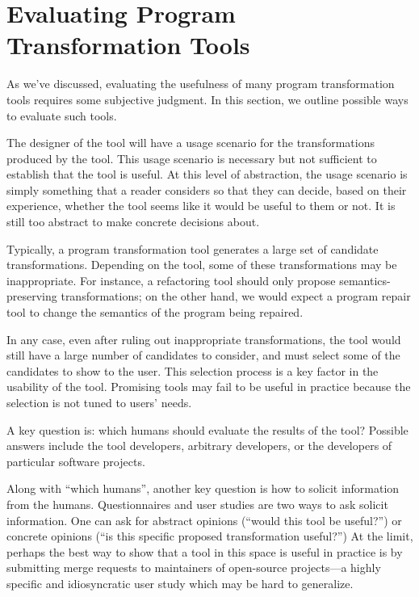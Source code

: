 \section{Evaluating Program Transformation Tools}
\label{sec:how-to-evaluate}
As we've discussed, evaluating the usefulness of many program
transformation tools requires some subjective judgment. In this
section, we outline possible ways to evaluate such tools.

The designer of the tool will have a usage scenario for the 
transformations produced by the tool. This usage scenario is 
necessary but not sufficient to establish that the tool is useful.
At this level of abstraction, the usage scenario is simply something
that a reader considers so that they can decide, based on their experience, 
whether the tool seems like it would be useful to them or not. 
It is still too abstract to make concrete decisions about.

Typically, a program transformation tool generates a large set of
candidate transformations. Depending on the tool, some of these
transformations may be inappropriate. For instance, a refactoring
tool should only propose semantics-preserving transformations; on the
other hand, we would expect a program repair tool to change the semantics
of the program being repaired. 

In any case, even after ruling out 
inappropriate transformations, the tool would still have a large
number of candidates to consider, and must select some of the candidates to show
to the user. This selection process is a key factor in the usability of the tool.
Promising tools may fail to be useful in practice because the selection is not
tuned to users' needs.

A key question is: which humans should evaluate the results of the tool?
Possible answers include the tool developers, arbitrary developers, or the developers
of particular software projects.

Along with ``which humans'', another key question is how to solicit
information from the humans. Questionnaires and user studies are two
ways to ask solicit information. One can ask for abstract opinions
(``would this tool be useful?'') or concrete opinions (``is this
specific proposed transformation useful?'') At the limit, perhaps the
best way to show that a tool in this space is useful in practice is by
submitting merge requests to maintainers of open-source projects---a 
highly specific and idiosyncratic user study which may be hard to generalize.

